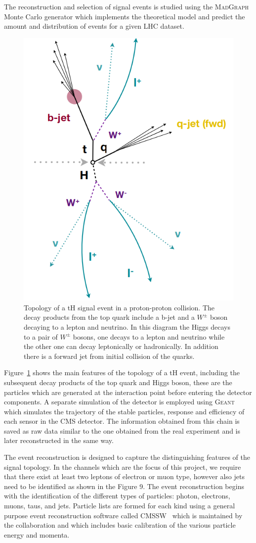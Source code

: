 \documentclass[final,3p]{CSP}
\begin{document}
The reconstruction and selection of signal events is studied using the \textsc{MadGraph}~\cite{alwall2014automated} Monte Carlo generator which implements the theoretical model and predict the amount and distribution of events for a given LHC dataset.


\begin{figure}[H]
	\centering
	\includegraphics[width=0.5\columnwidth]{./topology.png}
	\caption{Topology of a tH signal event in a proton-proton collision. The decay products from the top quark include a b-jet and a $W^{\pm}$ boson decaying to a lepton and neutrino. In this diagram the Higgs decays to a pair of $W^{\pm}$ bosons, one decays to a lepton and neutrino while the other one can decay leptonically or hadronically. In addition there is a forward jet from initial collision of the quarks.}
	\label{figureTopology}
\end{figure}
Figure~\ref{figureTopology} shows the main features of the topology of a tH event, including the subsequent decay products of the top quark and Higgs boson, these are the particles which are generated at the interaction point before entering the detector components.
A separate simulation of the detector is employed using \textsc{Geant}~\cite{agostinelli2003geant4} which simulates the trajectory of the stable particles, response and efficiency of each sensor in the CMS detector.
The information obtained from this chain is saved as raw data similar to the one obtained from the real experiment and is later reconstructed in the same way.

The event reconstruction is designed to capture the distinguishing features of the signal topology.
In the channels which are the focus of this project, we require that there exist at least two leptons of electron or muon type, however also jets need to be identified as shown in the Figure 9.
The event reconstruction begins with the identification of the different types of particles: photon, electrons, muons, taus, and jets.
Particle lists are formed for each kind using a general purpose event reconstruction software called \textsc{CMSSW}~\cite{Bayatian:922757} which is maintained by the collaboration and which includes basic calibration of the various particle energy and momenta.
\end{document}
